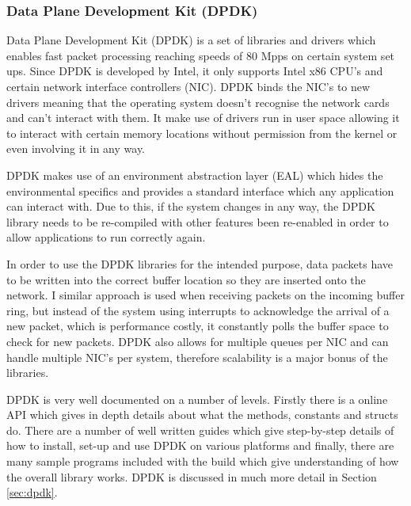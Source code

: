 \documentclass[final_report.tex]{subfiles}
\begin{document}
\subsubsection{Data Plane Development Kit (DPDK)}
\label{subsec:dpdk}
Data Plane Development Kit (DPDK) \cite{dpdk} is a set of libraries and drivers which enables fast packet processing reaching speeds of 80 Mpps on certain system set ups. Since DPDK is developed by Intel, it only supports Intel x86 CPU's and certain network interface controllers (NIC). DPDK binds the NIC's to new drivers meaning that the operating system doesn't recognise the network cards and can't interact with them. It make use of drivers run in user space allowing it to interact with certain memory locations without permission from the kernel or even involving it in any way.

DPDK makes use of an environment abstraction layer (EAL) which hides the environmental specifics and provides a standard interface which any application can interact with. Due to this, if the system changes in any way, the DPDK library needs to be re-compiled with other features been re-enabled in order to allow applications to run correctly again.

In order to use the DPDK libraries for the intended purpose, data packets have to be written into the correct buffer location so they are inserted onto the network. I similar approach is used when receiving packets on the incoming buffer ring, but instead of the system using interrupts to acknowledge the arrival of a new packet, which is performance costly, it constantly polls the buffer space to check for new packets. DPDK also allows for multiple queues per NIC and can handle multiple NIC's per system, therefore scalability is a major bonus of the libraries.

DPDK is very well documented on a number of levels. Firstly there is a online API which gives in depth details about what the methods, constants and structs do. There are a number of well written guides which give step-by-step details of how to install, set-up and use DPDK on various platforms and finally, there are many sample programs included with the build which give understanding of how the overall library works. DPDK is discussed in much more detail in Section \ref{sec:dpdk}.
\end{document}

